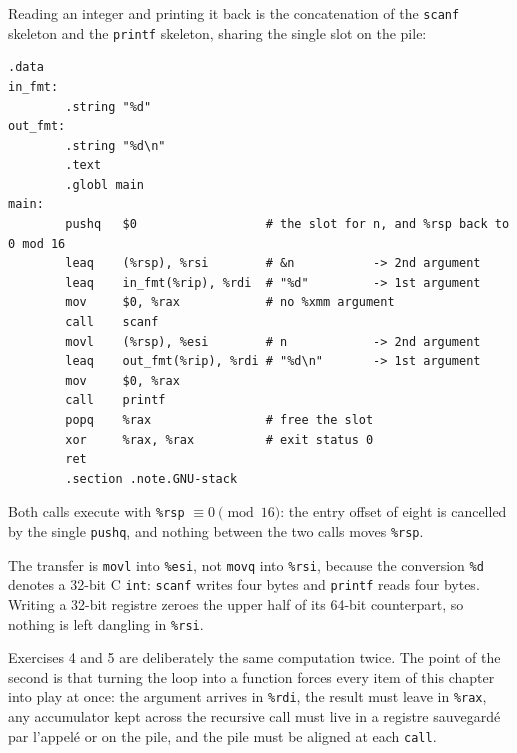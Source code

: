 \begin{example}
  Reading an integer and printing it back is the concatenation of the
  \texttt{scanf} skeleton and the \texttt{printf} skeleton, sharing the single
  slot on the pile:
\begin{lstlisting}[language=gas]
        .data
in_fmt:
        .string "%d"
out_fmt:
        .string "%d\n"
        .text
        .globl main
main:
        pushq   $0                  # the slot for n, and %rsp back to 0 mod 16
        leaq    (%rsp), %rsi        # &n           -> 2nd argument
        leaq    in_fmt(%rip), %rdi  # "%d"         -> 1st argument
        mov     $0, %rax            # no %xmm argument
        call    scanf
        movl    (%rsp), %esi        # n            -> 2nd argument
        leaq    out_fmt(%rip), %rdi # "%d\n"       -> 1st argument
        mov     $0, %rax
        call    printf
        popq    %rax                # free the slot
        xor     %rax, %rax          # exit status 0
        ret
        .section .note.GNU-stack
\end{lstlisting}
  Both calls execute with \texttt{\%rsp} $\equiv 0 \pmod{16}$: the entry offset
  of eight is cancelled by the single \texttt{pushq}, and nothing between the
  two calls moves \texttt{\%rsp}.
\end{example}

\begin{remark}
  The transfer is \texttt{movl} into \texttt{\%esi}, not \texttt{movq} into
  \texttt{\%rsi}, because the conversion \texttt{\%d} denotes a 32-bit C
  \texttt{int}: \texttt{scanf} writes four bytes and \texttt{printf} reads four
  bytes. Writing a 32-bit registre zeroes the upper half of its 64-bit
  counterpart, so nothing is left dangling in \texttt{\%rsi}.
\end{remark}

\begin{remark}
  Exercises 4 and 5 are deliberately the same computation twice. The point of
  the second is that turning the loop into a function forces every item of this
  chapter into play at once: the argument arrives in \texttt{\%rdi}, the result
  must leave in \texttt{\%rax}, any accumulator kept across the recursive call
  must live in a registre sauvegardé par l'appelé or on the pile, and the pile
  must be aligned at each \texttt{call}.
\end{remark}


